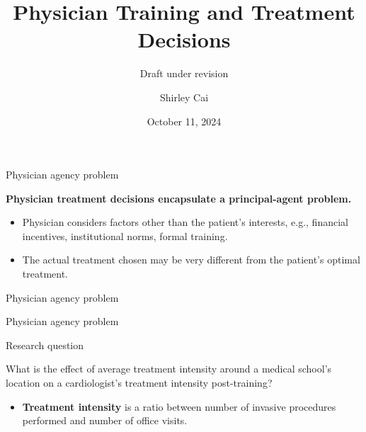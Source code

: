 \documentclass[10pt,aspectratio=169]{beamer}
\title{Physician Training and Treatment Decisions}
\subtitle{Draft under revision}
\author{Shirley Cai}
\date{October 11, 2024}
\institute{Emory University}
\begin{document}
\maketitle

\begin{frame}{Physician agency problem}

    \textbf{Physician treatment decisions encapsulate a principal-agent problem.}

    \vspace{5mm}
    \begin{itemize}
            \item Physician considers factors other than the patient's interests, e.g., financial incentives, institutional norms, formal training. 
            \item[$\to$] The actual treatment chosen may be very different from the patient's optimal treatment. 
        \end{itemize}
\end{frame}

\begin{frame}{Physician agency problem}
\end{frame}

\begin{frame}{Physician agency problem}

\end{frame}

\begin{frame}{Research question} \label{rq}

    What is the effect of average treatment intensity around a medical school's location on a cardiologist's treatment intensity post-training? 
        \begin{itemize}
            \item \textbf{Treatment intensity} is a ratio between number of invasive procedures performed and number of office visits. 
        \end{itemize}  
\end{frame}
\end{document}
